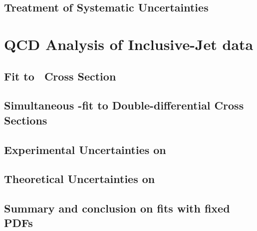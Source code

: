 \subsection{Treatment of Systematic Uncertainties}
\label{subsec:sysunctreatment}


\section{QCD Analysis of Inclusive-Jet data}
\label{sec:asfit}


\subsection{Fit to \dsdetjetb~Cross Section}
\label{subsec:singledifasfit}


\subsection{Simultaneous \asz-fit to Double-differential Cross Sections}
\label{subsec:doubledifasfit}


\subsection{Experimental Uncertainties on \asz}
\label{subsec:asexpunc}


\subsection{Theoretical Uncertainties on \asz}
\label{subsec:asthunc}


\subsection{Summary and conclusion on \asz fits with fixed PDFs}
\label{subsec:minisummary_asfit}


% 